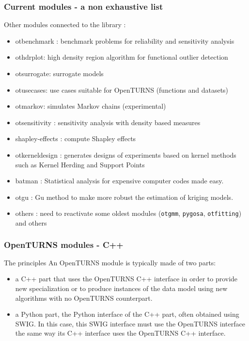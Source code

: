 \documentclass[8pt]{beamer}
\begin{document}
  \begin{frame}[containsverbatim]
    \frametitle{Current modules - a non exhaustive list}
    
    \alert{Other modules} connected to the library :
    \begin{itemize}
    \item \alert{otbenchmark} : benchmark problems for reliability and sensitivity analysis
    \item \alert{othdrplot}: high density region algorithm for functional outlier detection
    \item \alert{otsurrogate}: surrogate models
    \item \alert{otusecases}: use cases suitable for OpenTURNS (functions and datasets)
    \item \alert{otmarkov}: simulates Markov chains (experimental)
    \item \alert{otsensitivity} : sensitivity analysis with density based measures
    \item \alert{shapley-effects} : compute Shapley effects
    \item \alert{otkerneldesign} : generates designs of experiments based on kernel methods such as Kernel Herding and Support Points
    \item \alert{batman} : Statistical analysis for expensive computer codes made easy.
    \item \alert{otgu} : Gu method to make more robust the estimation of kriging models.
    \item \alert{others} : need to reactivate some oldest modules (\texttt{otgmm}, \texttt{pygosa}, \texttt{otfitting}) and others
  \end{itemize}
    \end{frame}
    
  
\begin{frame}
  \frametitle{OpenTURNS modules - C++}
  \centering {}
  \begin{block}{The principles}
    An OpenTURNS module is typically made of two parts:
    \begin{itemize}
    \item a C++ part that uses the OpenTURNS C++ interface in order to provide new specialization or to produce instances of the data model using new algorithms with no OpenTURNS counterpart.
    \item a Python part, the Python interface of the C++ part, often obtained using SWIG. In this case, this SWIG interface must use the OpenTURNS interface the same way its C++ interface uses the OpenTURNS C++ interface.
    \end{itemize}
  \end{block}
\end{frame}
\end{document}
